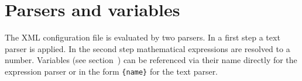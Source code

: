\section{Parsers and variables}\label{general.parser}
The XML configuration file is evaluated by two parsers. In a first step a text parser is applied.
In the second step mathematical expressions are resolved to a number.
Variables (see section~) can be referenced via their
name directly for the expression parser or in the form \verb|{name}| for the text parser.


